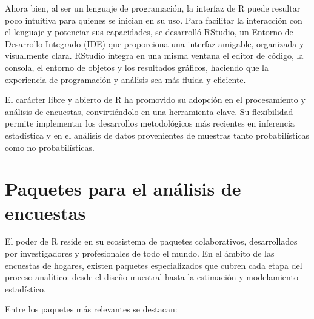 \documentclass[
  spanish,
  12pt,
]{book}
\begin{document}
Ahora bien, al ser un lenguaje de programación, la interfaz de R puede resultar poco intuitiva para quienes se inician en su uso. Para facilitar la interacción con el lenguaje y potenciar sus capacidades, se desarrolló RStudio, un Entorno de Desarrollo Integrado (IDE) que proporciona una interfaz amigable, organizada y visualmente clara. RStudio integra en una misma ventana el editor de código, la consola, el entorno de objetos y los resultados gráficos, haciendo que la experiencia de programación y análisis sea más fluida y eficiente.

El carácter libre y abierto de R ha promovido su adopción en el procesamiento y análisis de encuestas, convirtiéndolo en una herramienta clave. Su flexibilidad permite implementar los desarrollos metodológicos más recientes en inferencia estadística y en el análisis de datos provenientes de muestras tanto probabilísticas como no probabilísticas.

\section{Paquetes para el análisis de encuestas}\label{paquetes-para-el-anuxe1lisis-de-encuestas}

El poder de R reside en su ecosistema de paquetes colaborativos, desarrollados por investigadores y profesionales de todo el mundo. En el ámbito de las encuestas de hogares, existen paquetes especializados que cubren cada etapa del proceso analítico: desde el diseño muestral hasta la estimación y modelamiento estadístico.

Entre los paquetes más relevantes se destacan:
\end{document}
